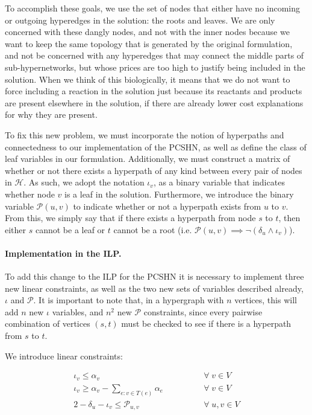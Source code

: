 \documentclass[12pt,twoside]{reedthesis}
\theoremstyle{definition}
\begin{document}
To accomplish these goals, we use the set of nodes that either have no incoming or outgoing hyperedges in the solution: the roots and leaves. We are only concerned with these dangly nodes, and not with the inner nodes because we want to keep the same topology that is generated by the original formulation, and not be concerned with any hyperedges that may connect the middle parts of sub-hypernetworks, but whose prices are too high to justify being included in the solution. When we think of this biologically, it means that we do not want to force including a reaction in the solution just because its reactants and products are present elsewhere in the solution, if there are already lower cost explanations for why they are present.\par

To fix this new problem, we must incorporate the notion of hyperpaths and connectedness to our implementation of the PCSHN, as well as define the class of leaf variables in our formulation. Additionally, we must construct a matrix of whether or not there exists a hyperpath of any kind between every pair of nodes in $\mathcal{H}$. As such, we adopt the notation $\iota_v$, as a binary variable that indicates whether node $v$ is a leaf in the solution. Furthermore, we introduce the binary variable $\mathcal{P}(u,v)$ to indicate whether or not a hyperpath exists from $u$ to $v$. From this, we simply say that if there exists a hyperpath from node $s$ to $t$, then either $s$ cannot be a leaf or $t$ cannot be a root (i.e. $\mathcal{P}(u,v)\implies\neg(\delta_u\wedge\iota_v)$).\par

\paragraph{Implementation in the ILP.}To add this change to the ILP for the PCSHN it is necessary to implement three new linear constraints, as well as the two new sets of variables described already, $\iota$ and $\mathcal{P}$. It is important to note that, in a hypergraph with $n$ vertices, this will add $n$ new $\iota$ variables, and $n^2$ new $\mathcal{P}$ constraints, since every pairwise combination of vertices $(s,t)$ must be checked to see if there is a hyperpath from $s$ to $t$.

We introduce linear constraints:

\begin{align}
 \iota_v \leq \alpha_v \qquad\qquad &\forall\; v \in V\label{eq:dc1}\\
 \iota_v \geq \alpha_{v} - \sum_{e:v \in T(e)} \alpha_e \qquad\qquad &\forall\; v \in V\label{eq:dc2}\\
 2 - \delta_u - \iota_v \leq \mathcal{P}_{u,v} \qquad\qquad &\forall\; u,v \in V\label{eq:dc3}%
\end{align}%
\end{document}
